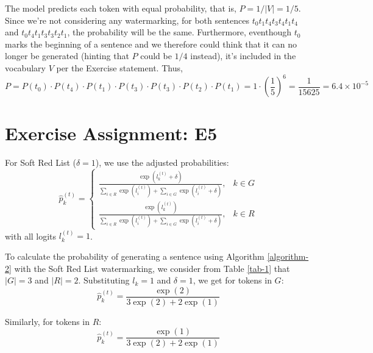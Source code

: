 \documentclass{article}
\begin{document}
The model predicts each token with equal probability, that is, $P = 1/|V| = 1/5$. Since we're not considering any watermarking, for both sentences \( t_0t_1t_4t_3t_4t_1t_4 \) and \( t_0t_4t_1t_3t_3t_2t_1 \), the probability will be the same. Furthermore, eventhough $t_0$ marks the beginning of a sentence and we therefore could think that it can no longer be generated (hinting that $P$ could be $1/4$ instead), it's included in the vocabulary $V$ per the Exercise statement. Thus,
\[
    P = P(t_0) \cdot P(t_4) \cdot P(t_1) \cdot P(t_3) \cdot P(t_3) \cdot P(t_2) \cdot P(t_1)
    = 1 \cdot \left(\frac{1}{5}\right)^6 = \frac{1}{15625} = 6.4 \times 10^{-5}
\]

\section{Exercise Assignment: E5}\label{sec:e5}

For Soft Red List (\(\delta = 1\)), we use the adjusted probabilities:
\[
    \hat{p}_k^{(t)} =
    \begin{cases}
        \frac{\exp(l_k^{(t)}+\delta)}{\sum_{i \in R}\exp(l_i^{(t)}) + \sum_{i \in G}\exp(l_i^{(t)}+\delta)}, & k \in G \\
        \frac{\exp(l_k^{(t)})}{\sum_{i \in R}\exp(l_i^{(t)}) + \sum_{i \in G}\exp(l_i^{(t)}+\delta)},        & k \in R
    \end{cases}
\]
with all logits \( l_k^{(t)} = 1 \).

To calculate the probability of generating a sentence using Algorithm \ref{algorithm-2} with the Soft Red List watermarking, we consider from Table \ref{tab-1} that \( |G| = 3 \) and \( |R| = 2 \). Substituting \( l_k = 1 \) and \( \delta = 1 \), we get for tokens in \( G \):
\[
    \hat{p}_k^{(t)} = \frac{\exp(2)}{3\exp(2) + 2\exp(1)}
\]

Similarly, for tokens in \( R \):
\[
    \hat{p}_k^{(t)} = \frac{\exp(1)}{3\exp(2) + 2\exp(1)}
\]
\end{document}
